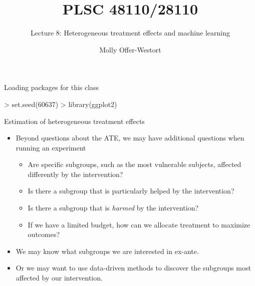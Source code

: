 \documentclass[xcolor={dvipsnames},handout]{beamer}
\title{PLSC 48110/28110}
\subtitle{Lecture 8: Heterogeneous treatment effects and machine learning}
\date{}
\author{Molly Offer-Westort}
\institute{Department of Political Science, \\University of Chicago}
\begin{document}
\frame{\titlepage
\thispagestyle{empty}
}


\begin{frame}[fragile]{Loading packages for this class}

\begin{Schunk}
\begin{Sinput}
> set.seed(60637)
> library(ggplot2)
\end{Sinput}
\end{Schunk}

\end{frame}










\begin{frame}{Estimation of heterogeneous treatment effects}


\begin{itemize}
\item Beyond questions about the ATE, we may have additional questions when running an experiment
\begin{itemize}
\item Are specific subgroups, such as the most vulnerable subjects, affected differently by the intervention?
\item Is there a subgroup that is particularly helped by the intervention?
\item Is there a subgroup that is \textit{harmed} by the intervention?
\item If we have a limited budget, how can we allocate treatment to maximize outcomes?
\end{itemize}
\item We may know what subgroups we are interested in ex-ante.
\item Or we may want to use data-driven methods to discover the subgroups most affected by our intervention.
\end{itemize}

\end{frame}
\end{document}
